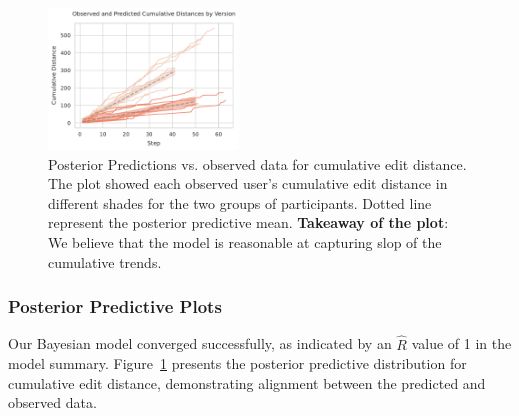 \begin{figure}[h!]
    \centering
    \includegraphics[width=0.45\textwidth]{content/image/distance/observed_and_predicted_cumulative_distances_by_version_m3.pdf}
    \caption{Posterior Predictions vs. observed data for cumulative edit distance. The plot showed each observed user's cumulative edit distance in different shades for the two groups of participants. Dotted line represent the posterior predictive mean. \textbf{Takeaway of the plot}: We believe that the model is reasonable at capturing slop of the cumulative trends.}
    \label{fig:observed_and_predicted_cumulative_distances_by_version_m3}
\end{figure}

\subsubsection{Posterior Predictive Plots}

Our Bayesian model converged successfully, as indicated by an $\hat{R}$ value of 1 in the model summary. Figure~\ref{fig:observed_and_predicted_cumulative_distances_by_version_m3} presents the posterior predictive distribution for cumulative edit distance, demonstrating alignment between the predicted and observed data.

\clearpage